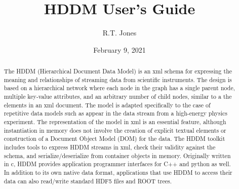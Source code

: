 \documentclass{revtex4}
\begin{document}

\title{HDDM User's Guide}


\author{R.T. Jones}


\date{February 9, 2021}

\begin{abstract}
The HDDM (Hierarchical Document Data Model) is an xml schema for expressing
the meaning and relationships of streaming data from scientific instruments.
The design is based on a hierarchical network where each node in the graph
has a single parent node, multiple key-value attributes, and an arbitrary
number of child nodes, similar to a the elements in an xml document.
The model is adapted specifically to the case of repetitive data models
such as appear in the data stream from a high-energy physics experiment.
The representation of the model in xml is an essential feature, although
instantiation in memory does not involve the creation of explicit textual
elements or construction of a Document Object Model (DOM) for the data.
The HDDM toolkit includes tools to express HDDM streams in xml, check their
validity against the schema, and serialize/deserialize from container
objects in memory. Originally written in c, HDDM provides application
programmer interfaces for C++ and python as well. In addition to its own
native data format, applications that use HDDM to access their data can
also read/write standard HDF5 files and ROOT trees.
\end{abstract}
\end{document}
